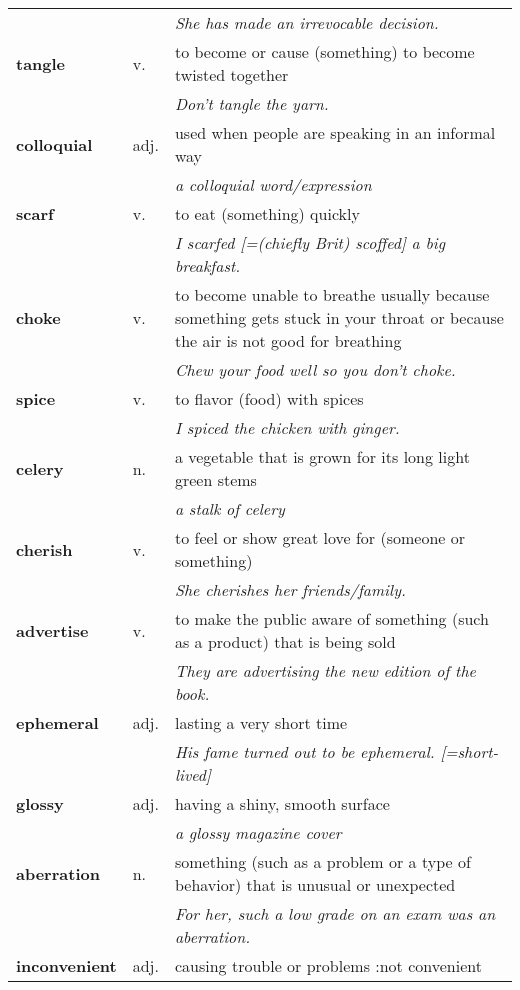 \documentclass[a4paper]{article}
\begin{document}
\begin{longtable}{llp{12cm}}
 & & \textit{She has made an irrevocable decision.}\\[0.08cm]
\textbf{tangle} & v. &  to become or cause (something) to become twisted together \\
 & & \textit{Don't tangle the yarn.}\\[0.08cm]
\textbf{colloquial} & adj. &  used when people are speaking in an informal way \\
 & & \textit{a colloquial word/expression}\\[0.08cm]
\textbf{scarf} & v. &  to eat (something) quickly \\
 & & \textit{I scarfed [=(chiefly Brit) scoffed] a big breakfast.}\\[0.08cm]
\textbf{choke} & v. &  to become unable to breathe usually because something gets stuck in your throat or because the air is not good for breathing \\
 & & \textit{Chew your food well so you don't choke.}\\[0.08cm]
\textbf{spice} & v. &  to flavor (food) with spices \\
 & & \textit{I spiced the chicken with ginger.}\\[0.08cm]
\textbf{celery} & n. &  a vegetable that is grown for its long light green stems \\
 & & \textit{a stalk of celery}\\[0.08cm]
\textbf{cherish} & v. &  to feel or show great love for (someone or something) \\
 & & \textit{She cherishes her friends/family.}\\[0.08cm]
\textbf{advertise} & v. &  to make the public aware of something (such as a product) that is being sold \\
 & & \textit{They are advertising the new edition of the book.}\\[0.08cm]
\textbf{ephemeral} & adj. &  lasting a very short time \\
 & & \textit{His fame turned out to be ephemeral. [=short-lived]}\\[0.08cm]
\textbf{glossy} & adj. &  having a shiny, smooth surface \\
 & & \textit{a glossy magazine cover}\\[0.08cm]
\textbf{aberration} & n. &  something (such as a problem or a type of behavior) that is unusual or unexpected \\
 & & \textit{For her, such a low grade on an exam was an aberration.}\\[0.08cm]
\textbf{inconvenient} & adj. &  causing trouble or problems :not convenient \\

\end{longtable}
\end{document}
